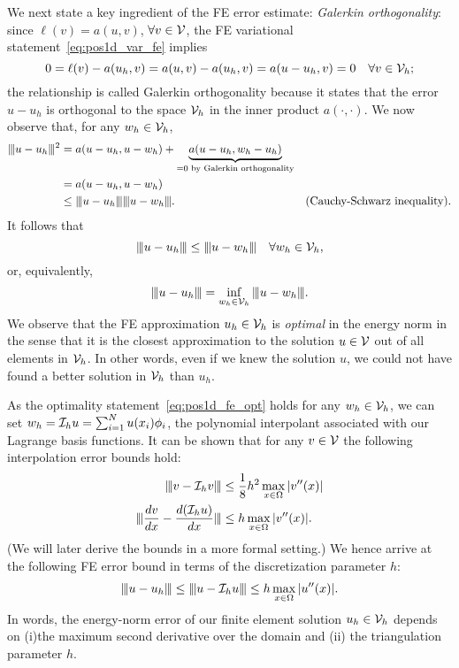 We next state a key ingredient of the FE error estimate: \emph{Galerkin orthogonality}: since $\ell(v) = a(u,v)$, $\forall v \in \mathcal{V}$, the FE variational statement~\eqref{eq:pos1d_var_fe} implies
\begin{equation*}
  0 = \ell(v) - a(u_h,v) = a(u,v) - a(u_h,v) = a(u-u_h,v) = 0 \quad \forall v \in \mathcal{V}_h;
\end{equation*}
the relationship is called Galerkin orthogonality because it states that the error $u - u_h$ is orthogonal to the space $\mathcal{V}_h$ in the inner product $a(\cdot,\cdot)$. We now observe that, for any $w_h \in \mathcal{V}_h$,
\begin{align*}
  \enorm{u-u_h}^2
  &=
  a(u-u_h, u-w_h) + \underbrace{ a(u-u_h,w_h - u_h) }_{= 0 \text{ by Galerkin orthogonality}}
  \\
  &=
  a(u-u_h, u - w_h)%
  \\
  &\leq  \enorm{u - u_h} \enorm{u - w_h}. & \text{(Cauchy-Schwarz inequality)}.
\end{align*}
It follows that
\begin{equation}
  |\kern-1pt|\kern-1pt| u - u_h |\kern-1pt|\kern-1pt| \leq |\kern-1pt|\kern-1pt| u - w_h |\kern-1pt|\kern-1pt| \quad \forall w_h \in \mathcal{V}_h,
  \label{eq:pos1d_fe_opt}
\end{equation}
or, equivalently,
\begin{equation*}
  |\kern-1pt|\kern-1pt| u-u_h |\kern-1pt|\kern-1pt| = \inf_{w_h \in \mathcal{V}_h} |\kern-1pt|\kern-1pt| u - w_h |\kern-1pt|\kern-1pt|.
\end{equation*}
We observe that the FE approximation $u_h \in \mathcal{V}_h$ is \emph{optimal} in the energy norm in the sense that it is the closest approximation to the solution $u \in \mathcal{V}$ out of all elements in $\mathcal{V}_h$.  In other words, even if we knew the solution $u$, we could not have found a better solution in $\mathcal{V}_h$ than $u_h$.

As the optimality statement~\eqref{eq:pos1d_fe_opt} holds for any $w_h \in \mathcal{V}_h$, we can set $w_h = \mathcal{I}_h u = \sum_{i=1}^N u(x_i) \phi_i$, the polynomial interpolant associated with our Lagrange basis functions.  It can be shown that for any $v \in \mathcal{V}$ the following interpolation error bounds hold:
\begin{align*}
  |\kern-1pt|\kern-1pt| v - \mathcal{I}_h v |\kern-1pt|\kern-1pt| &\leq \frac{1}{8} h^2 \max_{x \in \Omega} |v''(x)| \\
  |\kern-1pt|\kern-1pt| \frac{d v}{d x} - \frac{d (\mathcal{I}_h u)}{d x} |\kern-1pt|\kern-1pt| &\leq h \max_{x \in \Omega} |v''(x)| .
\end{align*}
(We will later derive the bounds in a more formal setting.) We hence arrive at the following FE error bound in terms of the discretization parameter $h$:
\begin{equation*}
  |\kern-1pt|\kern-1pt| u - u_h |\kern-1pt|\kern-1pt| \leq |\kern-1pt|\kern-1pt| u - \mathcal{I}_h u |\kern-1pt|\kern-1pt| \leq h \max_{x \in \Omega}  | u''(x) |.
\end{equation*}
In words, the energy-norm error of our finite element solution $u_h \in \mathcal{V}_h$  depends on  (i)the maximum second derivative over the domain and (ii) the triangulation parameter $h$.

